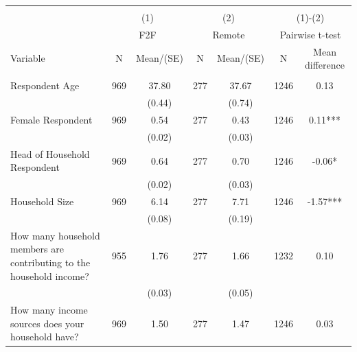 
\begin{tabular}{@{\extracolsep{5pt}}lcccccc}
\\[-1.8ex]\hline \hline \\[-1.8ex]
 & \multicolumn{2}{c}{(1)}  & \multicolumn{2}{c}{(2)}  & \multicolumn{2}{c}{(1)-(2)} \\
 & \multicolumn{2}{c}{F2F}  & \multicolumn{2}{c}{Remote}  & \multicolumn{2}{c}{Pairwise t-test}  \\
Variable & N & Mean/(SE) & N & Mean/(SE) & N & Mean difference \\ \hline \\[-1.8ex] 
Respondent Age   & 969    & 37.80    & 277    & 37.67    & 1246    & 0.13   \\
 &   & (0.44)  &   & (0.74)  &   &  \\ [1ex]
Female Respondent   & 969    & 0.54    & 277    & 0.43    & 1246    & 0.11***   \\
 &   & (0.02)  &   & (0.03)  &   &  \\ [1ex]
Head of Household Respondent   & 969    & 0.64    & 277    & 0.70    & 1246    & -0.06*   \\
 &   & (0.02)  &   & (0.03)  &   &  \\ [1ex]
Household Size   & 969    & 6.14    & 277    & 7.71    & 1246    & -1.57***   \\
 &   & (0.08)  &   & (0.19)  &   &  \\ [1ex]
How many household members are contributing to the household income?   & 955    & 1.76    & 277    & 1.66    & 1232    & 0.10   \\
 &   & (0.03)  &   & (0.05)  &   &  \\ [1ex]
How many income sources does your household have?   & 969    & 1.50    & 277    & 1.47    & 1246    & 0.03   \\

\end{tabular}

